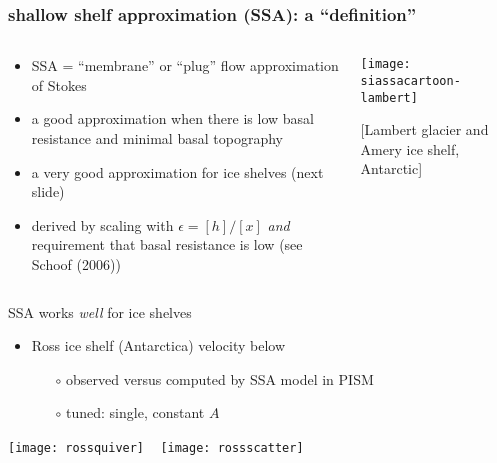 \documentclass{beamer}
\newcommand{\eps}{\epsilon}
\begin{document}
\begin{frame}
  \frametitle{shallow shelf approximation (SSA): a ``definition''}

\begin{columns}
\begin{column}{0.52\textwidth}
\begin{itemize}
\small
\item SSA = ``membrane'' or ``plug'' flow approximation of Stokes
\item a good approximation when there is low basal resistance and minimal basal topography
\item a very good approximation for ice shelves (next slide)
\item derived by scaling with $\eps = [h]/[x]$ \emph{and} requirement that basal resistance is low (see Schoof (2006))
\end{itemize}
\end{column}

\begin{column}{0.48\textwidth}
\texttt{[image: siassacartoon-lambert]}

\begin{center}
\vspace{-0.18in}
\tiny [Lambert glacier and Amery ice shelf, Antarctic]
\end{center}
\end{column}
\end{columns}
\end{frame}


\begin{frame}{SSA works \emph{well} for ice shelves}

\begin{itemize}
\item Ross ice shelf (Antarctica) velocity below
  \begin{itemize}
  \item[$\circ$] observed versus computed by SSA model in PISM
  \item[$\circ$] tuned: single, constant $A$
  \end{itemize}
\end{itemize}
\vspace{-0.3in}

\begin{center}
  \mbox{\texttt{[image: rossquiver]} \, \texttt{[image: rossscatter]}}
\end{center}
\end{frame}
\end{document}
